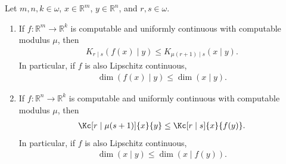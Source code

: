 \begin{lemma}
    \label{lemma:forward_data_processing_conditional}
    Let $m, n, k \in \omega$, $x \in \mathbb{R}^m$, $y \in \mathbb{R}^n$, and $r, s \in \omega$.
    
    \begin{enumerate}[label = (\roman*)]
        \item If $f: \mathbb{R}^m \to \mathbb{R}^k$ is computable and uniformly continuous with computable modulus $\mu$, then
        \begin{align*}
            K_{r \mid s}(f(x) \mid y) \leq K_{\mu(r + 1) \mid s}(x \mid y).
        \end{align*}
        In particular, if $f$ is also Lipschitz continuous,
        \begin{align*}
            \dim(f(x) \mid y) \leq \dim(x \mid y).
        \end{align*}
        \item If $f: \mathbb{R}^n \to \mathbb{R}^k$ is computable and uniformly continuous with computable modulus $\mu$, then
        \begin{align*}
            \Kc[r \mid \mu(s + 1)]{x}{y} \leq \Kc[r \mid s]{x}{f(y)}.
        \end{align*}
        In particular, if $f$ is also Lipschitz continuous,
        \begin{align*}
            \dim(x \mid y) \leq \dim(x \mid f(y)).
        \end{align*}
    \end{enumerate}
\end{lemma}
